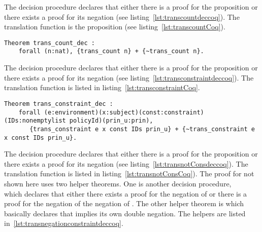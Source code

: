 The decision procedure  declares that either there is a proof for the proposition  or there exists a proof for its negation (see listing~\ref{lst:transcountdeccoq}). The translation function  is the proposition  (see listing~\ref{lst:transcountCoq}).

\begin{lstlisting}
Theorem trans_count_dec :
    forall (n:nat), {trans_count n} + {~trans_count n}.
\end{lstlisting}

The decision procedure  declares that either there is a proof for the proposition  or there exists a proof for its negation (see listing~\ref{lst:transconstraintdeccoq}). The translation function  is listed in listing~\ref{lst:transconstraintCoq}. 


\begin{minipage}[c]{0.95\textwidth}
\begin{lstlisting}
Theorem trans_constraint_dec :
    forall (e:environment)(x:subject)(const:constraint)(IDs:nonemptylist policyId)(prin_u:prin),
       {trans_constraint e x const IDs prin_u} + {~trans_constraint e x const IDs prin_u}.
\end{lstlisting}
\end{minipage}

The decision procedure  declares that either there is a proof for the proposition  or there exists a proof for its negation (see listing~\ref{lst:transnotConsdeccoq}). The translation function  is listed in listing~\ref{lst:transnotConsCoq}). The proof for  not shown here uses two helper theorems. One is another decision procedure, \\  which declares that either there exists a proof for the negation of  or there is a proof for the negation of the negation of . The other helper theorem is  which basically declares that  implies its own double negation. The helpers are listed in~\ref{lst:transnegationconstraintdeccoq}.

